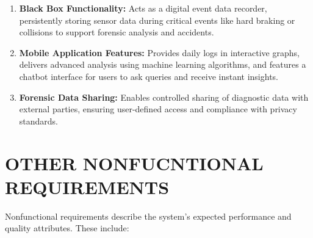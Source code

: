 \begin{enumerate}
    \item \textbf{Black Box Functionality:}
    Acts as a digital event data recorder, persistently storing sensor data during critical events like hard braking or collisions to support forensic analysis and accidents.
    \item \textbf{Mobile Application Features:}
    Provides daily logs in interactive graphs, delivers advanced analysis using machine learning algorithms, and features a chatbot interface for users to ask queries and receive instant insights.
    \item \textbf{Forensic Data Sharing:}
     Enables controlled sharing of diagnostic data with external parties, ensuring user-defined access and compliance with privacy standards.
\end{enumerate}

\section{OTHER NONFUCNTIONAL REQUIREMENTS}
Nonfunctional requirements describe the system's expected performance and quality attributes. These include:

